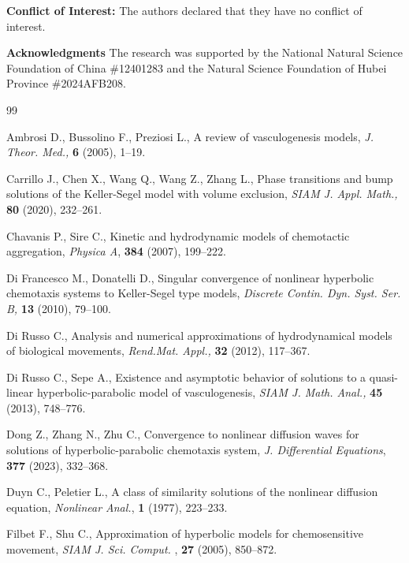 \documentclass[11pt]{article}
\theoremstyle{plain}
\numberwithin{equation}{section}
\begin{document}
	
	
	\vspace{6mm}

	 {\bf Conflict of Interest:} The authors declared that they have no conflict of interest.

\vspace{3mm}
	{\bf Acknowledgments} The research was supported by the National Natural Science Foundation of China \#12401283 and the Natural Science Foundation of Hubei Province \#2024AFB208.
	
	\bigbreak
	
	{\small
		
		\begin{thebibliography}{99}
		
			Ambrosi D., Bussolino F., Preziosi L., A review of vasculogenesis models, {\it J. Theor. Med.,} {\bf6} (2005), 1--19.
			
			Carrillo J., Chen  X., Wang Q., Wang Z., Zhang L., Phase transitions and bump solutions of the Keller-Segel model with volume exclusion, {\it SIAM J. Appl. Math.,}  {\bf80} (2020), 232--261.
			
			Chavanis P., Sire C., Kinetic and hydrodynamic models of chemotactic aggregation, {\it Physica A}, {\bf 384} (2007), 199--222.
			
			Di Francesco M., Donatelli D., Singular convergence of nonlinear hyperbolic chemotaxis systems to Keller-Segel
			type models, {\it Discrete Contin. Dyn. Syst. Ser. B,} {\bf13} (2010), 79--100.
			
			Di Russo C., Analysis and numerical approximations of hydrodynamical models of biological movements, {\it Rend.Mat. Appl.,}  {\bf32} (2012), 117--367.
			
			Di Russo C., Sepe A., Existence and asymptotic behavior of solutions to a quasi-linear hyperbolic-parabolic model
			of vasculogenesis, {\it SIAM J. Math. Anal.,} { \bf45} (2013), 748--776.

Dong Z., Zhang  N., Zhu  C., Convergence to nonlinear diffusion waves for solutions of hyperbolic-parabolic
 chemotaxis system, {\it J. Differential Equations}, {\bf 377} (2023), 332--368.

			Duyn C., Peletier L.,  A class of similarity solutions of the nonlinear diffusion equation, {\it Nonlinear Anal.}, {\bf 1} (1977), 223--233.
			
			Filbet F., Shu C., Approximation of hyperbolic models for chemosensitive movement, {\it SIAM J. Sci. Comput.}  ,  {\bf27} (2005), 850--872.
			

\end{thebibliography}}
\end{document}
